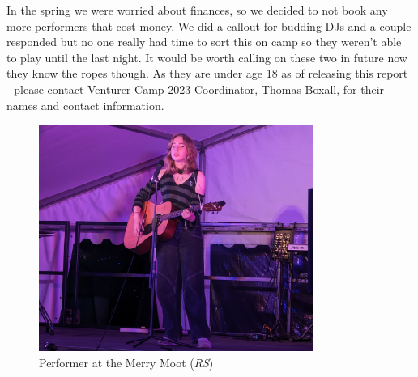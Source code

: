 In the spring we were worried about finances, so we decided to not book any more performers that cost money. We did a callout for budding DJs and a couple responded but no one really had time to sort this on camp so they weren't able to play until the last night. It would be worth calling on these two in future now they know the ropes though. As they are under age 18 as of releasing this report - please contact Venturer Camp 2023 Coordinator, Thomas Boxall, for their names and contact information. 

\begin{figure}[ht]
    \centering
    \includegraphics[width=0.8\textwidth]{assets/evening-performance-rs.jpg}
    \caption{Performer at the Merry Moot (\textit{RS})}
\end{figure}

